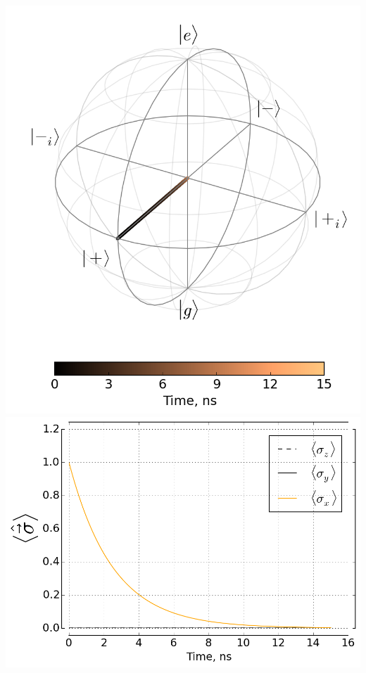 \documentclass[aspectratio=169, 13pt, t]{beamer}
\begin{document}
{{	\begin{columns}[c]
	\includegraphics[width=\textwidth]{qdeph_bloch_rf}
	\includegraphics[width=\textwidth]{qdeph_xyz_rf}
	\end{columns}
}
}
\end{document}
